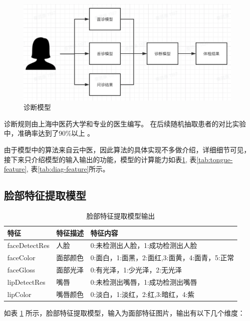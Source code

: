 \begin{figure}[ht]
    \centering
    \includegraphics[width=15cm]{images/model2.png}
    \caption{诊断模型}
    \label{fig:my_model2}
\end{figure}
诊断规则由上海中医药大学和专业的医生编写。
在后续随机抽取患者的对比实验中，准确率达到了90\%以上 \cite{Zhang2018Study}。

由于模型中的算法来自云中医，因此算法的具体实现不多做介绍，详细细节可见\cite{Zhang2018Study, Qiu2015Adaptive, Hu2016Robust}，接下来只介绍模型的输入输出的功能，模型的计算能力如表\ref{tab:face-feature}, 表\ref{tab:tongue-feature}, 表\ref{tab:diag-feature}所示。
\subsection{脸部特征提取模型}

\begin{table}[h]
    \centering
    \begin{tabular}{lll}
        \toprule
        特征          & 特征描述     & 特征内容 \\ 
        \midrule
        faceDetectRes & 人脸   & 0:未检测出人脸，1:成功检测出人脸  \\
        faceColor     & 面部颜色 & 0:面白，1:面黑，2:面红,3:面黄，4:面青，5:正常 \\
        faceGloss     & 面部光泽 & 0:有光泽，1:少光泽，2:无光泽\\
        lipDetectRes  & 嘴唇   & 0:未检测出嘴唇，1:成功检测出嘴唇\\
        lipColor      & 嘴唇颜色 & 0:淡白，1:淡红，2:红,3:暗红，4:紫   \\
        \bottomrule
    \end{tabular}
    \caption{脸部特征提取模型输出}
    \label{tab:face-feature}
\end{table}

如表 \ref{tab:face-feature} 所示，脸部特征提取模型，输入为面部特征图片，输出有以下几个维度：

